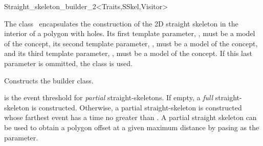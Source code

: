 

\begin{ccRefClass}{Straight_skeleton_builder_2<Traits,SSkel,Visitor>}

\ccDefinition
The class \ccRefName\  encapsulates the construction of the 2D straight skeleton in the interior of a polygon with holes. Its first template parameter, , must be a model of the  concept, its second template parameter, , must be a model of the  concept, and its third template parameter, , must be a model of the  concept. If this last parameter is ommitted, the class  is used.

 
\ccTypes
\ccGlue
\ccGlue
\ccGlue
\ccGlue
\ccGlue

\ccCreation
{}

{Constructs the builder class.

 is the event threshold for \textit{partial} straight-skeletons. If empty, a \textit{full} straight-skeleton is constructed. Otherwise, a partial straight-skeleton is constructed whose farthest event has a time no greater than . A partial straight skeleton can be used to obtain a polygon offset at a given maximum distance  by pasing  as the  parameter.}


\end{ccRefClass}
